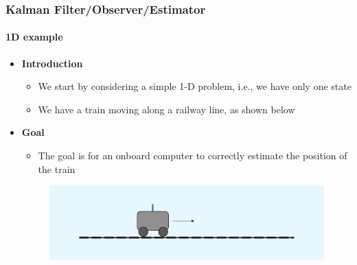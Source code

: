 \begin{frame}[plain]\pw\Large
\frametitle{Kalman Filter/Observer/Estimator}
\framesubtitle{1D example}

\scriptsize

\begin{itemize}\scriptsize
\item \textbf{Introduction}
\begin{itemize}\scriptsize
\item We start by considering a simple 1-D problem, i.e., we have only one state
\item We have a train moving along a railway line, as shown below
\end{itemize}
\item \textbf{Goal}
\begin{itemize}\scriptsize
\item The goal is for an onboard computer to correctly estimate the position of the train
\end{itemize}
\begin{figure}[h]
\centering
\includegraphics[width=1.35\textwidth]{figs/2012_MAG_Understanding_the_Basis_of_the_Kalman_Filter_fig0.pdf}
\end{figure}
\end{itemize}

\end{frame}




